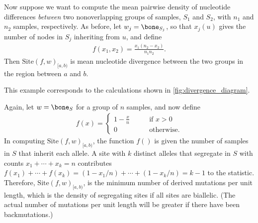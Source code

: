 \documentclass{article}
\newcommand{\site}{\mbox{Site}} %
\newcommand{\iw}{w} %
\newcommand{\nw}{x} %
\begin{document}
\begin{example} \label{ex:site_divergence}
    Now suppose we want to compute the mean pairwise density of nucleotide differences
    \emph{between} two nonoverlapping groups of samples, $S_1$ and $S_2$,
    with $n_1$ and $n_2$ samples, respectively.
    As before,
    let $\iw_j = \bone_{S_j}$,
    so that $\nw_{j}(u)$ gives the number of nodes in $S_j$ inheriting from $u$,
    and define
    \begin{align*}
        f(x_1, x_2) = \frac{x_1 (n_2 - x_2)}{n_1 n_2} .
    \end{align*}
    Then $\site(f, \iw)_{[a,b)}$ is mean nucleotide divergence between the two groups
    in the region between $a$ and $b$.
\end{example}

This example corresponds to the calculations shown in \autoref{fig:divergence_diagram}.

\begin{example} \label{ex:segregating_sites}
    Again, let $\iw = \bone_{S}$ for a group of $n$ samples,
    and now define
    \begin{align*}
        f(x) = \begin{cases}
            1 - \frac{x}{n} \qquad &\text{if } x > 0 \\
            0 \qquad &\text{otherwise} .
        \end{cases}
    \end{align*}
    In computing $\site(f, \iw)_{[a,b)}$, the function $f()$ is given the number of samples in $S$
    that inherit each allele.
    A site with $k$ distinct alleles that segregate in $S$ with counts $x_1 + \cdots + x_k = n$
    contributes $f(x_1) + \cdots + f(x_k) = (1 - x_1/n) + \cdots + (1 - x_k/n) = k - 1$
    to the statistic. 
    Therefore, $\site(f, \iw)_{[a,b)}$, is the minimum number of derived mutations per unit length,
    which is the density of segregating sites if all sites are biallelic.
    (The actual number of mutations per unit length will be greater if there have been backmutations.)
\end{example}
\end{document}
